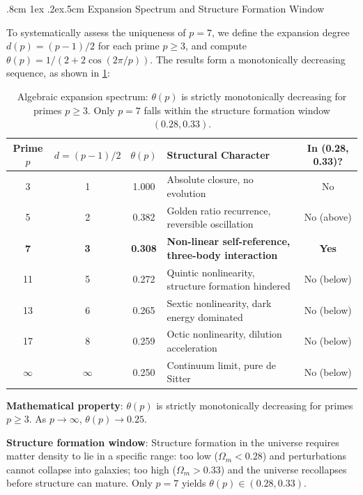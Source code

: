 \documentclass[aps,prd,twocolumn,nofootinbib,floatfix]{revtex4-2}
\makeatletter
\def\subsubsection{%
  \@startsection{subsubsection}{3}{\z@}
    {.8cm \@plus1ex \@minus .2ex}{.5cm}
    {\normalfont\normalsize\itshape\centering}%
}
\makeatother
\begin{document}
\subsubsection{Expansion Spectrum and Structure Formation Window}

To systematically assess the uniqueness of $p=7$, we define the expansion degree $d(p) = (p-1)/2$ for each prime $p \ge 3$, and compute $\theta(p) = 1/(2+2\cos(2\pi/p))$. The results form a monotonically decreasing sequence, as shown in \cref{tab:expansion_spectrum}:

\begin{table}[!t]
\centering
\begin{tabular}{ccclc}
\hline
Prime $p$ & $d=(p-1)/2$ & $\theta(p)$ & Structural Character & In (0.28, 0.33)? \\
\hline
3 & 1 & 1.000 & Absolute closure, no evolution & No \\
5 & 2 & 0.382 & Golden ratio recurrence, reversible oscillation & No (above) \\
\textbf{7} & \textbf{3} & \textbf{0.308} & \textbf{Non-linear self-reference, three-body interaction} & \textbf{Yes} \\
11 & 5 & 0.272 & Quintic nonlinearity, structure formation hindered & No (below) \\
13 & 6 & 0.265 & Sextic nonlinearity, dark energy dominated & No (below) \\
17 & 8 & 0.259 & Octic nonlinearity, dilution acceleration & No (below) \\
$\infty$ & $\infty$ & 0.250 & Continuum limit, pure de Sitter & No (below) \\
\hline
\end{tabular}
\caption{Algebraic expansion spectrum: $\theta(p)$ is strictly monotonically decreasing for primes $p \ge 3$. Only $p=7$ falls within the structure formation window $(0.28, 0.33)$.}
\label{tab:expansion_spectrum}
\end{table}

\textbf{Mathematical property}: $\theta(p)$ is strictly monotonically decreasing for primes $p \ge 3$. As $p \to \infty$, $\theta(p) \to 0.25$.

\textbf{Structure formation window}: Structure formation in the universe requires matter density to lie in a specific range: too low ($\Omega_m < 0.28$) and perturbations cannot collapse into galaxies; too high ($\Omega_m > 0.33$) and the universe recollapses before structure can mature. Only $p=7$ yields $\theta(p) \in (0.28, 0.33)$.
\end{document}
